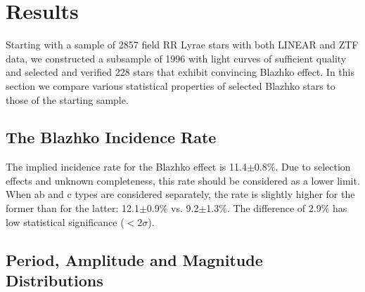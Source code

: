 

\section{Results}\label{sec:results}

Starting with a sample of 2857 field RR Lyrae stars with both LINEAR and ZTF data, we constructed a subsample of
1996 with light curves of sufficient quality and selected and verified 228 stars that exhibit convincing Blazhko effect.
In this section we compare various statistical properties of selected Blazhko stars to those of the starting sample. 

\subsection{The Blazhko Incidence Rate}

The implied incidence rate for the Blazhko effect is
11.4$\pm$0.8\%. Due to selection effects and unknown completeness,
this rate should be considered as a lower limit. 
When ab and c types are considered separately, the
rate is slightly higher for the former than for the latter: 12.1$\pm$0.9\%
vs. 9.2$\pm$1.3\%.  The difference of 2.9\% has low statistical significance ($<2\sigma$). 


\subsection{Period, Amplitude and Magnitude Distributions}

